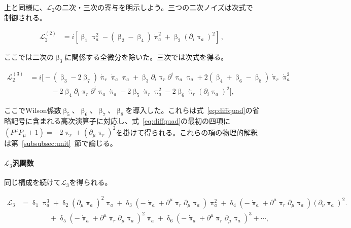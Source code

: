 \documentclass[a4paper,11pt]{ltjsarticle}
\numberwithin{equation}{section}
\newcommand{\Eq}[1]{Eq.~(\ref{#1})}
\newcommand{\Sec}[1]{Sec.~\ref{#1}}
\renewcommand{\Eq}[1]{式~\eqref{#1}}
\renewcommand{\Sec}[1]{第~\ref{#1}~節}
\begin{document}
上と同様に、$\mathcal{L}_2$の二次・三次の寄与を明示しよう。三つの二次ノイズは次式で制御される。

\begin{align}
\mathcal{L}_2^{(2)} &= i \left[\upbeta_1 \uppi_a^2 - \left(\upbeta_2 - \upbeta_4\right)\dot{\uppi}_a^2 + \upbeta_2 \left(\partial_i \uppi_{a} \right)^2\right]\,,\label{eq:piq2free}
\end{align}

ここでは二次の$\upbeta_3$に関係する全微分を除いた。三次では次式を得る。

\begin{align}\label{eq:cubicinter2}
\mathcal{L}_2^{(3)} &= i \Big[-(\upbeta_3 -2 \upbeta_7)\dot{\uppi}_{r} \dot{\uppi}_{a} \uppi_a + \upbeta_3 \partial_i \uppi_{r}  \partial^i \uppi_{a} \uppi_a +2 (\upbeta_4+\upbeta_6 - \upbeta_8) \dot{\uppi}_{r} \dot{\uppi}_a^2 \nonumber \\
& \qquad \quad - 2 \upbeta_4   \partial_i \uppi_{r}  \partial^i \uppi_{a} \dot{\uppi}_{a} - 2\upbeta_5 \dot{\uppi}_{r} \uppi_a^2  - 2 \upbeta_6 \dot{\uppi}_{r}(\partial_i\uppi_a)^2\Big],
\end{align}

ここでWilson係数$\upbeta_5$、$\upbeta_6$、$\upbeta_7$、$\upbeta_8$を導入した。これらは\Eq{eq:diffquad}の省略記号に含まれる高次演算子に対応し、\Eq{eq:diffquad}の最初の四項に$(P^\mu P_\mu+1)=-2\dot{\uppi}_r+(\partial_\mu\uppi_r)^2$を掛けて得られる。これらの項の物理的解釈は\Sec{subsubsec:unit}で論じる。

\paragraph{$\mathcal{L}_3$汎関数}

同じ構成を続けて$\mathcal{L}_3$を得られる。

\begin{align}
        \mathcal{L}_3 &= \updelta_1 \uppi_a^3 + \updelta_2 (\partial_\mu \uppi_a)^2 \uppi_a + \updelta_3 \left(-\dot{\uppi}_{a} + \partial^\mu \uppi_{r} \partial_\mu \uppi_{a}\right) \uppi_a^2 + \updelta_4 \left(-\dot{\uppi}_{a} + \partial^\mu \uppi_{r} \partial_\mu \uppi_{a}\right) (\partial_\nu \uppi_a)^2 \Big.  \nonumber\\
        &\qquad \qquad + \updelta_5 \left(-\dot{\uppi}_{a} + \partial^\mu \uppi_{r} \partial_\mu \uppi_{a}\right)^2 \uppi_a  + \updelta_6 \left(-\dot{\uppi}_{a} + \partial^\mu \uppi_{r} \partial_\mu \uppi_{a}\right)^3 + \cdots,
    \end{align}
\end{document}
